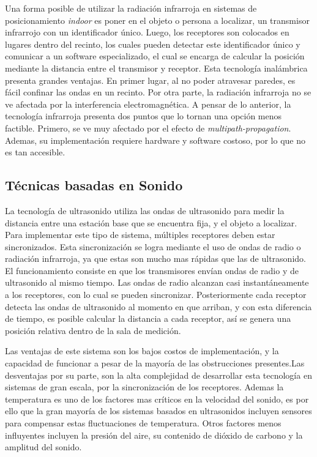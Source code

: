 Una forma posible de utilizar la radiación infrarroja en sistemas de posicionamiento \textit{indoor} es poner en el objeto o persona a localizar, un transmisor infrarrojo con un identificador único. Luego, los receptores son colocados en lugares dentro del recinto, los cuales pueden detectar este identificador único y comunicar a un software especializado, el cual se encarga de calcular la posición mediante la distancia entre el transmisor y receptor. Esta tecnología inalámbrica presenta grandes ventajas. En primer lugar, al no poder atravesar paredes, es fácil confinar las ondas en un recinto. Por otra parte, la radiación infrarroja no se ve afectada por la interferencia electromagnética. A pensar de lo anterior, la tecnología infrarroja presenta dos puntos que lo tornan una opción menos factible. Primero, se ve muy afectado por el efecto de \textit{multipath-propagation}. Ademas, su implementación requiere hardware y software costoso, por lo que no es tan accesible.

\subsection{Técnicas basadas en Sonido}

La tecnología de ultrasonido utiliza las ondas de ultrasonido para medir la distancia entre una estación base que se encuentra fija, y el objeto a localizar. Para implementar este tipo de sistema, múltiples receptores deben estar sincronizados. Esta sincronización se logra mediante el uso de ondas de radio o radiación infrarroja, ya que estas son mucho mas rápidas que las de ultrasonido. El funcionamiento consiste en que los transmisores envían ondas de radio y de ultrasonido al mismo tiempo. Las ondas de radio alcanzan casi instantáneamente a los receptores, con lo cual se pueden sincronizar. Posteriormente cada receptor detecta las ondas de ultrasonido al momento en que arriban, y con esta diferencia de tiempo, es posible calcular la distancia a cada receptor, así se genera una posición relativa dentro de la sala de medición.

Las ventajas de este sistema son los bajos costos de implementación, y la capacidad de funcionar a pesar de la mayoría de las obstrucciones presentes.Las desventajas por su parte, son la alta complejidad de desarrollar esta tecnología en sistemas de gran escala, por la sincronización de los receptores. Ademas la temperatura es uno de los factores mas críticos en la velocidad del sonido, es por ello que la gran mayoría de los sistemas basados en ultrasonidos incluyen sensores para compensar estas fluctuaciones de temperatura. Otros factores menos influyentes incluyen la presión del aire, su contenido de dióxido de carbono y la amplitud del sonido.

